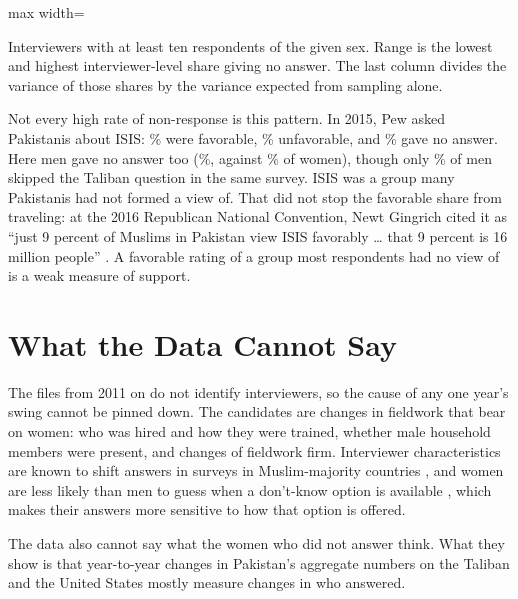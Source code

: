 \documentclass[11pt,letterpaper]{article}
\newcommand{\TableStyle}{\normalsize\setlength{\tabcolsep}{6pt}\renewcommand{\arraystretch}{1}}
\newcommand{\tablenote}[1]{\par\smallskip\begin{minipage}{\linewidth}\footnotesize #1\end{minipage}}
\begin{document}
\begin{table}[htbp]
\centering\TableStyle
\caption{No-answer rates across interviewers, 2009 and 2010}
\label{tab:interviewers}
\begin{adjustbox}{max width=\linewidth}

\end{adjustbox}
\tablenote{Interviewers with at least ten respondents of the given sex. Range is the lowest and highest interviewer-level share giving no answer. The last column divides the variance of those shares by the variance expected from sampling alone.}
\end{table}

Not every high rate of non-response is this pattern. In 2015, Pew asked Pakistanis about ISIS: \IsisFav{}\% were favorable, \IsisUnfav{}\% unfavorable, and \IsisNone{}\% gave no answer. Here men gave no answer too (\IsisNoneMen{}\%, against \IsisNoneWomen{}\% of women), though only \MenTalibanNoneLast{}\% of men skipped the Taliban question in the same survey. ISIS was a group many Pakistanis had not formed a view of. That did not stop the favorable share from traveling: at the 2016 Republican National Convention, Newt Gingrich cited it as ``just 9 percent of Muslims in Pakistan view ISIS favorably \ldots{} that 9 percent is 16 million people'' \citep{politifact2016gingrich}. A favorable rating of a group most respondents had no view of is a weak measure of support.

\section{What the Data Cannot Say}

The files from 2011 on do not identify interviewers, so the cause of any one year's swing cannot be pinned down. The candidates are changes in fieldwork that bear on women: who was hired and how they were trained, whether male household members were present, and changes of fieldwork firm. Interviewer characteristics are known to shift answers in surveys in Muslim-majority countries \citep{benstead2014dress}, and women are less likely than men to guess when a don't-know option is available \citep{mondak2004knowledge}, which makes their answers more sensitive to how that option is offered.

The data also cannot say what the women who did not answer think. What they show is that year-to-year changes in Pakistan's aggregate numbers on the Taliban and the United States mostly measure changes in who answered.
\end{document}
